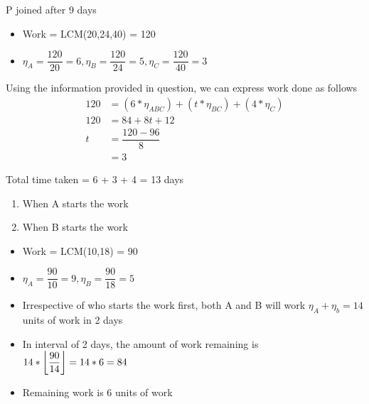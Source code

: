 P joined after 9 days


\begin{itemize}
    \item Work = LCM(20,24,40) = 120
    \item $\eta_A = \dfrac{120}{20} = 6, \eta_B = \dfrac{120}{24} = 5, \eta_C = \dfrac{120}{40} = 3$
\end{itemize}

Using the information provided in question, we can express work done as follows
\begin{align*}
    120 &= (6 * \eta_{ABC}) + (t * \eta_{BC}) + (4 * \eta_C) \\
    120 &= 84 + 8t + 12 \\
    t &= \dfrac{120 - 96}{8} \\
    &= 3
\end{align*}

Total time taken = 6 + 3 + 4 = 13 days


\begin{enumerate}
    \item When A starts the work
    \item When B starts the work
\end{enumerate}

\vspace{1cm}

\begin{itemize}
    \item Work = LCM(10,18) = 90
    \item $\eta_A = \dfrac{90}{10} = 9, \eta_B = \dfrac{90}{18} = 5$
    \item Irrespective of who starts the work first, both A and B will work $\eta_A + \eta_b = 14$ units of work in 2 days
    \item In interval of 2 days, the amount of work remaining is $14 * \displaystyle{\left \lfloor {\dfrac{90}{14}} \right \rfloor} = 14 * 6 = 84$
    \item Remaining work is 6 units of work  
\end{itemize}


